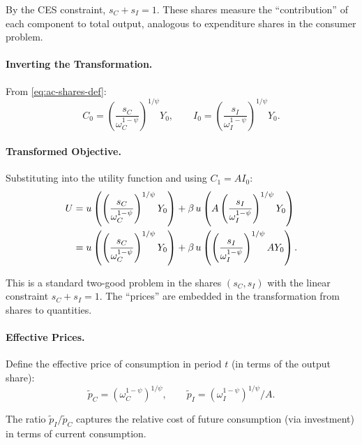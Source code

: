 By the CES constraint, $s_C + s_I = 1$. These shares measure the ``contribution'' of each component to total output, analogous to expenditure shares in the consumer problem.

\paragraph{Inverting the Transformation.}
From \cref{eq:ac-shares-def}:
\begin{equation}
C_0 = \left( \frac{s_C}{\omega_C^{1-\psi}} \right)^{1/\psi} Y_0, \qquad I_0 = \left( \frac{s_I}{\omega_I^{1-\psi}} \right)^{1/\psi} Y_0.
\label{eq:ac-invert}
\end{equation}

\paragraph{Transformed Objective.}
Substituting into the utility function and using $C_1 = A I_0$:
\begin{align}
U &= u\left( \left( \frac{s_C}{\omega_C^{1-\psi}} \right)^{1/\psi} Y_0 \right) + \beta \, u\left( A \left( \frac{s_I}{\omega_I^{1-\psi}} \right)^{1/\psi} Y_0 \right) \notag \\
&= u\left( \left( \frac{s_C}{\omega_C^{1-\psi}} \right)^{1/\psi} Y_0 \right) + \beta \, u\left( \left( \frac{s_I}{\omega_I^{1-\psi}} \right)^{1/\psi} A Y_0 \right).
\label{eq:ac-transformed-U}
\end{align}

This is a standard two-good problem in the shares $(s_C, s_I)$ with the linear constraint $s_C + s_I = 1$. The ``prices'' are embedded in the transformation from shares to quantities.

\paragraph{Effective Prices.}
Define the effective price of consumption in period $t$ (in terms of the output share):
\begin{equation}
\tilde{p}_C = \left( \omega_C^{1-\psi} \right)^{1/\psi}, \qquad \tilde{p}_I = \left( \omega_I^{1-\psi} \right)^{1/\psi} / A.
\label{eq:ac-effective-prices}
\end{equation}

The ratio $\tilde{p}_I / \tilde{p}_C$ captures the relative cost of future consumption (via investment) in terms of current consumption.

